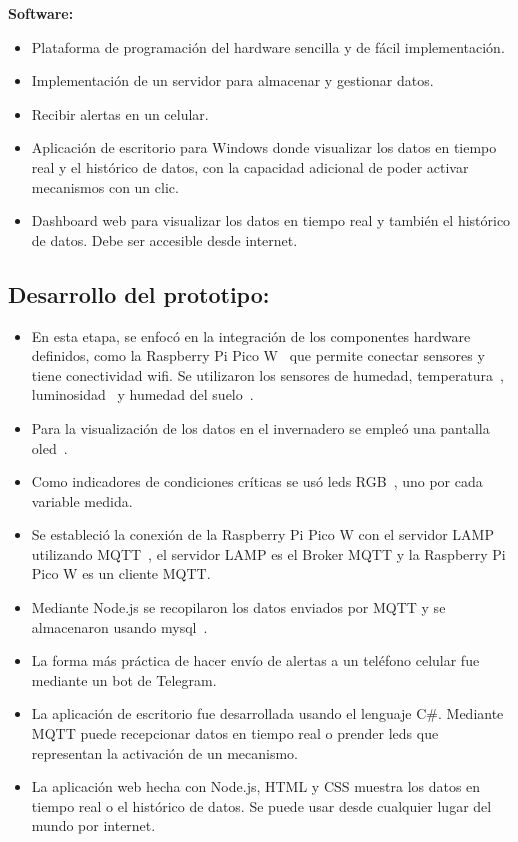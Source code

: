 \textbf{Software:}
\begin{itemize}
	\item Plataforma de programación del hardware sencilla y de fácil implementación.
	\item Implementación de un servidor para almacenar y gestionar datos.
	\item Recibir alertas en un celular.
	\item Aplicación de escritorio para Windows donde visualizar los datos en tiempo real y el histórico de datos, con la capacidad adicional de poder activar mecanismos con un clic.
	\item Dashboard web para visualizar los datos en tiempo real y también el histórico de datos. Debe ser accesible desde internet.
\end{itemize}

\subsection{Desarrollo del prototipo:}

\begin{itemize}
	\item En esta etapa, se enfocó en la integración de los componentes hardware definidos, como la Raspberry Pi Pico W~\cite{misc:RPiPicoW} que permite conectar sensores y tiene conectividad wifi. Se utilizaron los sensores de humedad, temperatura~\cite{manual:DHT22}, luminosidad~\cite{manual:BH1750} y humedad del suelo~\cite{wiki:SensorHumedadSuelo}.

	\item Para la visualización de los datos en el invernadero se empleó una pantalla oled~\cite{manual:Oled}.

	\item Como indicadores de condiciones críticas se usó leds RGB~\cite{manual:LedRGB}, uno por cada variable medida.

	\item Se estableció la conexión de la Raspberry Pi Pico W con el servidor LAMP utilizando MQTT~\cite{manual:MQTT}, el servidor LAMP es el Broker MQTT y la Raspberry Pi Pico W es un cliente MQTT.

	\item Mediante Node.js se recopilaron los datos enviados por MQTT y se almacenaron usando mysql~\cite{misc:Mysql}.

	\item La forma más práctica de hacer envío de alertas a un teléfono celular fue mediante un bot de Telegram.

	\item La aplicación de escritorio fue desarrollada usando el lenguaje C\#. Mediante MQTT puede recepcionar datos en tiempo real o prender leds que representan la activación de un mecanismo.

	\item La aplicación web hecha con Node.js, HTML y CSS muestra los datos en tiempo real o el histórico de datos. Se puede usar desde cualquier lugar del mundo por internet.
\end{itemize}

